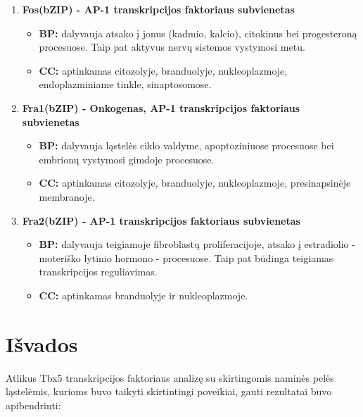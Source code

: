 \documentclass[12pt]{article}
\begin{document}
\begin{enumerate}
    \item \textbf{Fos(bZIP)\cite{FOS} - AP-1 transkripcijos
                  faktoriaus subvienetas}
        \begin{itemize}
            \item \textbf{BP:} dalyvauja atsako į jonus (kadmio, kalcio),
                citokinus bei progesteroną procesuose. Taip pat aktyvus nervų
                sistemos vystymosi metu.
            \item \textbf{CC:} aptinkamas citozolyje, branduolyje,
                nukleoplazmoje, endoplazminiame tinkle, sinaptosomose.
        \end{itemize}

    \item \textbf{Fra1(bZIP)\cite{FRA1} - Onkogenas, AP-1 transkripcijos
                  faktoriaus subvienetas}
        \begin{itemize}
            \item \textbf{BP:} dalyvauja ląstelės ciklo valdyme, apoptoziniuose
                procesuose bei embrionų vystymosi gimdoje procesuose.
            \item \textbf{CC:} aptinkamas citozolyje, branduolyje,
                nukleoplazmoje, presinapsinėje membranoje.
        \end{itemize}

    \item \textbf{Fra2(bZIP)\cite{FRA2} - AP-1 transkripcijos
                  faktoriaus subvienetas}
        \begin{itemize}
            \item \textbf{BP:} dalyvauja teigiamoje fibroblastų
                proliferacijoje, atsako į estradiolio - moteriško
                lytinio hormono - procesuose. Taip pat būdinga teigiamas
                transkripcijos reguliavimas.
            \item \textbf{CC:} aptinkamas branduolyje ir nukleoplazmoje.
        \end{itemize}
\end{enumerate}

\newpage


\section{Išvados}
Atlikus Tbx5 transkripcijos faktoriaus analizę su skirtingomis naminės pelės
ląstelėmis, kurioms buvo taikyti skirtintingi poveikiai, gauti rezultatai buvo
apibendrinti:
\end{document}
